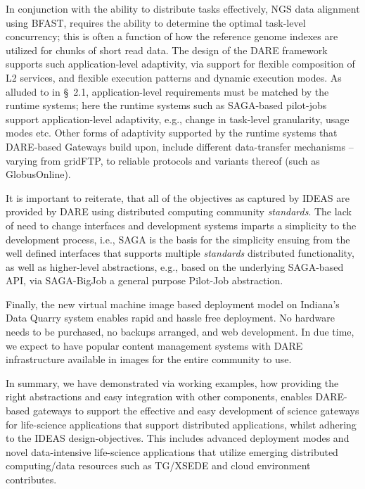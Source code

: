 \documentclass[]{svjour3}
\begin{document}

In conjunction with the ability to distribute tasks effectively, NGS
data alignment using BFAST, requires the ability to determine the
optimal task-level concurrency; this is often a function of how the
reference genome indexes are utilized for chunks of short read
data\cite{dare-ecmls11}.  The design of the DARE framework supports
such application-level adaptivity, via support for flexible
composition of L2 services, and flexible execution patterns and
dynamic execution modes. As alluded to in \S~2.1, application-level
requirements must be matched by the runtime systems; here the runtime
systems such as SAGA-based pilot-jobs support application-level
adaptivity, e.g., change in task-level granularity, usage modes etc.
Other forms of adaptivity supported by the runtime systems that
DARE-based Gateways build upon, include different data-transfer
mechanisms -- varying from gridFTP, to reliable protocols and variants
thereof (such as GlobusOnline).


It is important to reiterate, that all of the objectives as captured
by IDEAS are provided by DARE using distributed computing community
{\it standards}. The lack of need to change interfaces and development
systems imparts a simplicity to the development process, i.e., SAGA is
the basis for the simplicity ensuing from the well defined interfaces
that supports multiple {\it standards} distributed functionality, as
well as higher-level abstractions, e.g., based on the underlying
SAGA-based API, via SAGA-BigJob a general purpose Pilot-Job
abstraction.

Finally, the new virtual machine image based deployment model on
Indiana's Data Quarry system enables rapid and hassle free
deployment. No hardware needs to be purchased, no backups arranged,
and web development. In due time, we expect to have popular content
management systems with DARE infrastructure available in images for
the entire community to use.

In summary, we have demonstrated via working examples, how providing
the right abstractions and easy integration with other components,
enables DARE-based gateways to support the effective and easy
development of science gateways for life-science applications that
support distributed applications, whilst adhering to the IDEAS
design-objectives. This includes advanced deployment modes and novel
data-intensive life-science applications that utilize emerging
distributed computing/data resources such as TG/XSEDE and cloud
environment contributes.
\end{document}

